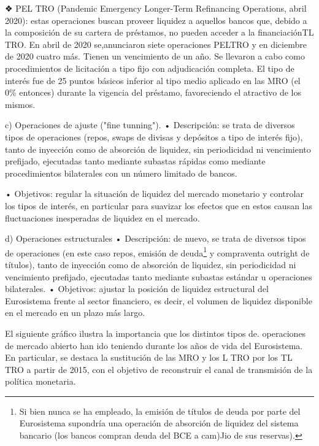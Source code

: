 \documentclass[10pt,a4paper]{article}
\begin{document}
{❖ PEL TRO (Pandemic Emergency Longer-Term Refinancing Operations, abril 2020): estas operaciones buscan proveer liquidez a aquellos bancos que, debido a la composición de su cartera de préstamos, no pueden acceder a la financiaciónTL TRO. En abril de 2020 se,anunciaron siete operaciones PELTRO y en diciembre de 2020 cuatro más. Tienen un vencimiento de un año. Se llevaron a cabo como procedimientos de licitación a tipo fijo con adjudicación completa. El tipo de interés fue de 25 puntos básicos inferior al tipo medio aplicado en las MRO (el 0\% entonces) durante la vigencia del préstamo, favoreciendo el atractivo de los mismos.

c) Operaciones de ajuste ("fine tunning"). 
• Descripción: se trata de diversos tipos de operaciones (repos, swaps de divisas y depósitos a tipo de interés fijo), tanto de inyección como de absorción de liquidez, sin periodicidad ni vencimiento prefijado, ejecutadas tanto mediante subastas rápidas como mediante procedimientos bilaterales con un número limitado de bancos.

• Objetivos: regular la situación de liquidez del mercado monetario y controlar los tipos de interés, en particular para suavizar los efectos que en estos causan las fluctuaciones inesperadas de liquidez en el mercado.

d) Operaciones estructurales
• Descripción: de nuevo, se trata de diversos tipos de operaciones (en este caso repos, emisión de deuda\footnote{%
    Si bien nunca se ha empleado, la emisión de títulos de deuda por parte del Eurosistema supondría una operación de absorción de liquidez del sistema bancario (los bancos compran deuda del BCE a cam)Jio de sus reservas).
} y compraventa outright de títulos), tanto de inyección como de absorción de liquidez, sin periodicidad ni vencimiento prefijado, ejecutadas tanto mediante subastas estándar u operaciones bilaterales. 
• Objetivos: ajustar la posición de liquidez estructural del Eurosistema frente al sector financiero, es decir, el volumen de liquidez disponible en el mercado en un plazo más largo. 

El siguiente gráfico ilustra la importancia que los distintos tipos de. operaciones de mercado abierto han ido teniendo durante los años de vida del Eurosistema. En particular, se destaca la sustitución de las MRO y los L TRO por los TL TRO a partir de 2015, con el objetivo de reconstruir el canal de transmisión de la política monetaria.

}
\end{document}

